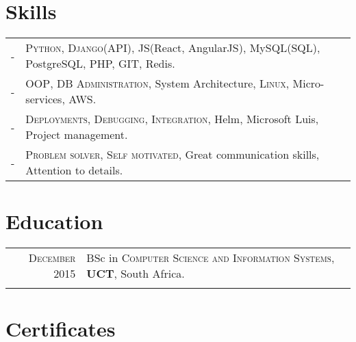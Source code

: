 \documentclass[a4paper,10pt]{article} %
\begin{document}

\section{Skills}

\begin{tabular}{rl}
- & \textsc{Python, Django(API)}, JS(React, AngularJS), MySQL(SQL), PostgreSQL, PHP, GIT, Redis.\\

- & \textsc{OOP}, \textsc{DB Administration}, System Architecture, \textsc{Linux}, Micro-services, AWS.\\

- & \textsc{Deployments, Debugging, Integration}, Helm, Microsoft Luis, Project management.\\

- & \textsc{Problem solver, Self motivated}, Great communication skills, Attention to details.\\
\end{tabular}




\section{Education}

\begin{tabular}{rl}	
\textsc{December} 2015 & BSc in \textsc{Computer Science and Information Systems}, \textbf{UCT}, South Africa.\\
&\\
\end{tabular}


\section{Certificates}
\end{document}
